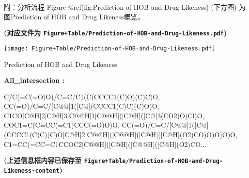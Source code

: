 \documentclass[
  ignorenonframetext,
]{beamer}
\begin{document}
\begin{frame}[fragile]{附：分析流程}
\protect\hypertarget{workflow}{}
Figure @ref(fig:Prediction-of-HOB-and-Drug-Likeness) (下方图)
为图Prediction of HOB and Drug Likeness概览。

\textbf{(对应文件为
\texttt{Figure+Table/Prediction-of-HOB-and-Drug-Likeness.pdf})}

\def\@captype{figure}
\begin{center}
\texttt{[image: Figure+Table/Prediction-of-HOB-and-Drug-Likeness.pdf]}
\caption{Prediction of HOB and Drug Likeness}\label{fig:Prediction-of-HOB-and-Drug-Likeness}
\end{center}
\begin{center}\begin{tcolorbox}[colback=gray!10, colframe=gray!50, width=0.9\linewidth, arc=1mm, boxrule=0.5pt]
\textbf{
All\_intersection
:}

\vspace{0.5em}

    C/C(=C\C(=O)O)/C=C/C1(C(CCCC1(C)O)(C)C)O,
CC(=O)/C=C/[C@@]1([C@](CCCC1(C)C)(C)O)O,
C1CO[C@H]2[C@H]3[C@@H]1[C@@H]([C@H]([C@]3(CO2)O)Cl)O,
COC1=C(C=CC(=C1)CCC(=O)O)O,
CC(=O)/C=C/[C@@]1([C@](CCCC1(C)C)(C)O[C@H]2[C@@H]([C@@H]([C@H]([C@H](O2)CO)O)O)O)O,
C1=CC(=CC=C1CCOC2[C@@H]([C@H]([C@@H]([C@H](O2)CO...

\vspace{2em}
\end{tcolorbox}
\end{center}

\textbf{(上述信息框内容已保存至
\texttt{Figure+Table/Prediction-of-HOB-and-Drug-Likeness-content})}
\end{frame}
\end{document}

